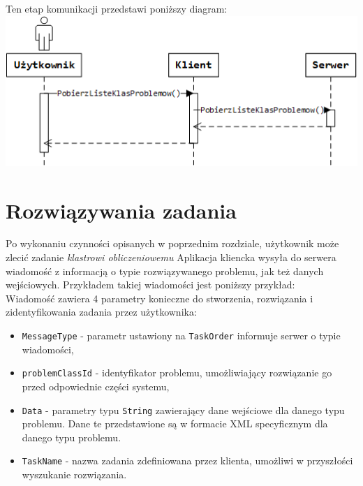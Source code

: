 \documentclass[12pt,a4paper,titlepage]{report}
\begin{document}
	Ten etap komunikacji przedstawi poniższy diagram:\\
	
	\includegraphics[width=\textwidth]{img/communication/problemclass.png}
    
    \section{Rozwiązywania zadania}
    Po wykonaniu czynności opisanych w poprzednim rozdziale, użytkownik może zlecić zadanie \textit{klastrowi obliczeniowemu}
    Aplikacja kliencka wysyła do serwera wiadomość z informacją o typie rozwiązywanego problemu, jak też danych wejściowych.
    Przykładem takiej wiadomości jest poniższy przykład: \\
    
    
    
    Wiadomość zawiera 4 parametry konieczne do stworzenia, rozwiązania i zidentyfikowania zadania przez użytkownika:
    \begin{itemize}
    	\item \verb+MessageType+ - parametr ustawiony na \verb+TaskOrder+ informuje serwer o typie wiadomości,
    	\item \verb+problemClassId+ - identyfikator problemu, umożliwiający rozwiązanie go przed odpowiednie części systemu,
    	\item \verb+Data+ - parametry typu \verb+String+ zawierający dane wejściowe dla danego typu problemu. Dane te przedstawione są w formacie XML specyficznym dla danego typu problemu.
    	\item \verb+TaskName+ - nazwa zadania zdefiniowana przez klienta, umożliwi w przyszłości wyszukanie rozwiązania.  
    \end{itemize}
	
\end{document}
